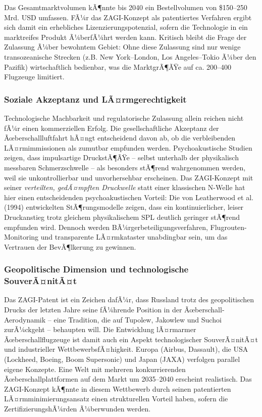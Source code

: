 ﻿\documentclass[12pt,a4paper]{article}
\theoremstyle{definition}
\theoremstyle{remark}
\begin{document}
Das Gesamtmarktvolumen kÃ¶nnte bis 2040 ein Bestellvolumen von \$150--250 Mrd. USD
umfassen. FÃ¼r das ZAGI-Konzept als patentiertes Verfahren ergibt sich damit
ein erhebliches Lizenzierungspotenzial, sofern die Technologie in ein marktreifes
Produkt Ã¼berfÃ¼hrt werden kann. Kritisch bleibt die Frage der Zulassung Ã¼ber bewohntem Gebiet:
Ohne diese Zulassung sind nur wenige transozeanische Strecken (z.B. New York--London,
Los Angeles--Tokio Ã¼ber den Pazifik) wirtschaftlich bedienbar, was die MarktgrÃ¶ÃŸe auf
ca. 200--400 Flugzeuge limitiert.

\subsubsection{Soziale Akzeptanz und LÃ¤rmgerechtigkeit}

Technologische Machbarkeit und regulatorische Zulassung allein reichen nicht fÃ¼r einen
kommerziellen Erfolg. Die gesellschaftliche Akzeptanz der Ãœberschallluftfahrt hÃ¤ngt
entscheidend davon ab, ob die verbleibenden LÃ¤rmimmissionen als zumutbar empfunden werden.
Psychoakustische Studien zeigen, dass impulsartige DruckstÃ¶ÃŸe -- selbst unterhalb der
physikalisch messbaren Schmerzschwelle -- als besonders stÃ¶rend wahrgenommen werden,
weil sie unkontrollierbar und unvorhersehbar erscheinen. Das ZAGI-Konzept mit seiner
\emph{verteilten, gedÃ¤mpften Druckwelle} statt einer klassischen N-Welle hat hier
einen entscheidenden psychoakustischen Vorteil: Die von Leatherwood et al. (1994)
entwickelten StÃ¶rungsmodelle zeigen, dass ein kontinuierlicher, leiser Druckanstieg
trotz gleichem physikalischem SPL deutlich geringer stÃ¶rend empfunden wird.
Dennoch werden BÃ¼rgerbeteiligungsverfahren, Flugrouten-Monitoring und transparente
LÃ¤rmkataster unabdingbar sein, um das Vertrauen der BevÃ¶lkerung zu gewinnen.

\subsubsection{Geopolitische Dimension und technologische SouverÃ¤nitÃ¤t}

Das ZAGI-Patent ist ein Zeichen dafÃ¼r, dass Russland trotz des geopolitischen Drucks
der letzten Jahre seine fÃ¼hrende Position in der Ãœberschall-Aerodynamik -- eine Tradition,
die auf Tupolew, Jakowlew und Suchoi zurÃ¼ckgeht -- behaupten will. Die Entwicklung
lÃ¤rmarmer Ãœberschallflugzeuge ist damit auch ein Aspekt technologischer SouverÃ¤nitÃ¤t
und industrieller WettbewerbsfÃ¤higkeit. Europa (Airbus, Dassault), die USA (Lockheed,
Boeing, Boom Supersonic) und Japan (JAXA) verfolgen parallel eigene Konzepte.
Eine Welt mit mehreren konkurrierenden Ãœberschallplattformen auf dem Markt um 2035--2040
erscheint realistisch. Das ZAGI-Konzept kÃ¶nnte in diesem Wettbewerb durch seinen
patentierten LÃ¤rmminimierungsansatz einen strukturellen Vorteil haben, sofern die
ZertifizierungshÃ¼rden Ã¼berwunden werden.
\end{document}
